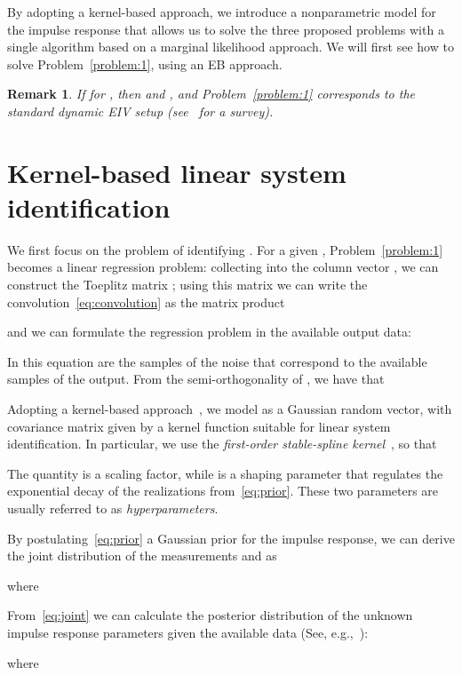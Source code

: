 \documentclass[10pt]{article}
\newtheorem{remark}{Remark}
\begin{document}
By adopting a kernel-based approach, we introduce a nonparametric model for
the impulse response that allows us to solve the three proposed problems
with a single algorithm based on a marginal likelihood approach. We will first
see how to solve Problem~\ref{problem:1}, using an EB approach.

\begin{remark}
  If  for , then  and , and  Problem~\ref{problem:1} corresponds to the standard dynamic
  EIV setup (see~\cite{soederstroem2007errors} for a survey).
\end{remark}

\section{Kernel-based linear system identification}\label{sec:sysid}
We first focus on the problem of identifying . For a given ,
Problem~\ref{problem:1} becomes a linear regression problem: collecting
 into the column vector , we can construct the 
Toeplitz matrix ; using this matrix we can write the
convolution~\eqref{eq:convolution} as the matrix product

and we can formulate the regression problem in the available output data:

In this equation  are the samples of the
noise that correspond to the available samples of the output. From the
semi-orthogonality of , we have that

Adopting a kernel-based approach~\cite{pillonetto2014kernel}, we model  as a
Gaussian random vector, with covariance matrix given by a kernel function
suitable for linear system identification. In particular, we use the
\emph{first-order stable-spline kernel}~\cite{pillonetto2010new}, so that

The quantity  is a scaling factor, while  is a
shaping parameter that regulates the exponential decay of the realizations from~\eqref{eq:prior}. These two parameters are usually referred to as
\emph{hyperparameters}.

By postulating~\eqref{eq:prior}  a Gaussian prior for the impulse response, we can
derive the joint distribution of the measurements  and  as

where

From~\eqref{eq:joint} we can calculate the posterior distribution of the unknown
impulse response parameters given the available data  (See, e.g.,~\cite[App. B.7]{soederstroem1981identification}):

where
\end{document}
